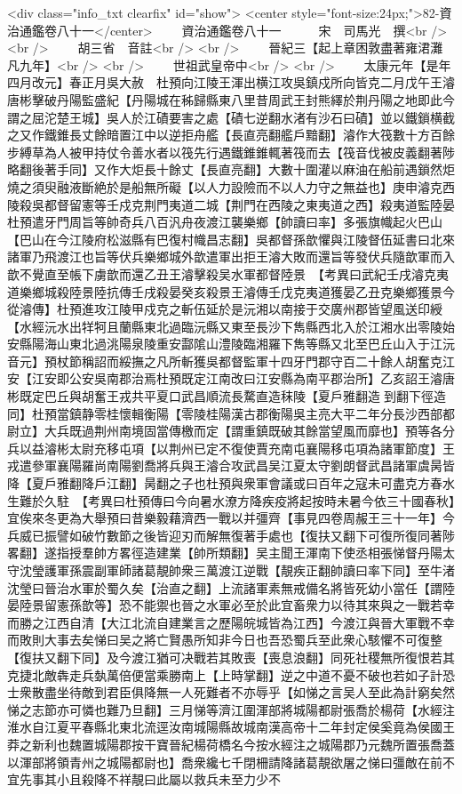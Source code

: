 <div class="info_txt clearfix" id="show">
<center style="font-size:24px;">82-資治通鑑卷八十一</center>
  　　資治通鑑卷八十一　　　宋　司馬光　撰<br />
<br />
　　胡三省　音註<br />
<br />
　　晉紀三【起上章困敦盡著雍涒灘凡九年】<br />
<br />
　　世祖武皇帝中<br />
<br />
　　太康元年【是年四月改元】春正月吳大赦　杜預向江陵王渾出横江攻吳鎮戍所向皆克二月戊午王濬唐彬擊破丹陽監盛紀【丹陽城在秭歸縣東八里昔周武王封熊繹於荆丹陽之地即此今謂之屈沱楚王城】吳人於江磧要害之處【磧七逆翻水渚有沙石曰磧】並以鐵鎖横截之又作鐵錐長丈餘暗置江中以逆拒舟艦【長直亮翻艦戶黯翻】濬作大筏數十方百餘步縛草為人被甲持仗令善水者以筏先行遇鐵錐錐輒著筏而去【筏音伐被皮義翻著陟略翻後著手同】又作大炬長十餘丈【長直亮翻】大數十圍灌以麻油在船前遇鎖然炬燒之須臾融液斷絶於是船無所礙【以人力設險而不以人力守之無益也】庚申濬克西陵殺吳都督留憲等壬戍克荆門夷道二城【荆門在西陵之東夷道之西】殺夷道監陸晏杜預遣牙門周旨等帥奇兵八百汎舟夜渡江襲樂鄉【帥讀曰率】多張旗幟起火巴山【巴山在今江陵府松滋縣有巴復村幟昌志翻】吳都督孫歆懼與江陵督伍延書曰北來諸軍乃飛渡江也旨等伏兵樂鄉城外歆遣軍出拒王濬大敗而還旨等發伏兵隨歆軍而入歆不覺直至帳下虜歆而還乙丑王濬擊殺吴水軍都督陸景　【考異曰武紀壬戌濬克夷道樂鄉城殺陸景陸抗傳壬戌殺晏癸亥殺景王濬傳壬戊克夷道獲晏乙丑克樂鄉獲景今從濬傳】杜預進攻江陵甲戍克之斬伍延於是沅湘以南接于交廣州郡皆望風送印綬【水經沅水出䍧牱且蘭縣東北過臨沅縣又東至長沙下雋縣西北入於江湘水出零陵始安縣陽海山東北過洮陽泉陵重安酃隂山澧陵臨湘羅下雋等縣又北至巴丘山入于江沅音元】預杖節稱詔而綏撫之凡所斬獲吳都督監軍十四牙門郡守百二十餘人胡奮克江安【江安即公安吳南郡治焉杜預既定江南改曰江安縣為南平郡治所】乙亥詔王濬唐彬既定巴丘與胡奮王戎共平夏口武昌順流長騖直造秣陵【夏戶雅翻造到翻下徑造同】杜預當鎮静零桂懷輯衡陽【零陵桂陽漢古郡衡陽吳主亮大平二年分長沙西部都尉立】大兵既過荆州南境固當傳檄而定【謂重鎮既破其餘當望風而靡也】預等各分兵以益濬彬太尉充移屯項【以荆州已定不復使賈充南屯襄陽移屯項為諸軍節度】王戎遣參軍襄陽羅尚南陽劉喬將兵與王濬合攻武昌吴江夏太守劉朗督武昌諸軍虞昺皆降【夏戶雅翻降戶江翻】昺翻之子也杜預與衆軍會議或曰百年之寇未可盡克方春水生難於久駐　【考異曰杜預傳曰今向暑水潦方降疾疫將起按時未暑今依三十國春秋】宜俟來冬更為大舉預曰昔樂毅藉濟西一戰以并彊齊【事見四卷周赧王三十一年】今兵威已振譬如破竹數節之後皆迎刃而解無復著手處也【復扶又翻下可復所復同著陟畧翻】遂指授羣帥方畧徑造建業【帥所類翻】吴主聞王渾南下使丞相張悌督丹陽太守沈瑩護軍孫震副軍師諸葛靚帥衆三萬渡江逆戰【靚疾正翻帥讀曰率下同】至牛渚沈瑩曰晉治水軍於蜀久矣【治直之翻】上流諸軍素無戒備名將皆死幼小當任【謂陸晏陸景留憲孫歆等】恐不能禦也晉之水軍必至於此宜畜衆力以待其來與之一戰若幸而勝之江西自清【大江北流自建業言之歷陽皖城皆為江西】今渡江與晉大軍戰不幸而敗則大事去矣悌曰吴之將亡賢愚所知非今日也吾恐蜀兵至此衆心駭懼不可復整【復扶又翻下同】及今渡江猶可决戰若其敗喪【喪息浪翻】同死社稷無所復恨若其克捷北敵犇走兵埶萬倍便當乘勝南上【上時掌翻】逆之中道不憂不破也若如子計恐士衆散盡坐待敵到君臣俱降無一人死難者不亦辱乎【如悌之言吴人至此為計窮矣然悌之志節亦可憐也難乃旦翻】三月悌等濟江圍渾部將城陽都尉張喬於楊荷【水經注淮水自江夏平春縣北東北流逕汝南城陽縣故城南漢高帝十二年封定侯奚竟為侯國王莽之新利也魏置城陽郡按干寶晉紀楊荷橋名今按水經注之城陽郡乃元魏所置張喬蓋以渾部將領青州之城陽都尉也】喬衆纔七千閉柵請降諸葛靚欲屠之悌曰彊敵在前不宜先事其小且殺降不祥靚曰此屬以救兵未至力少不